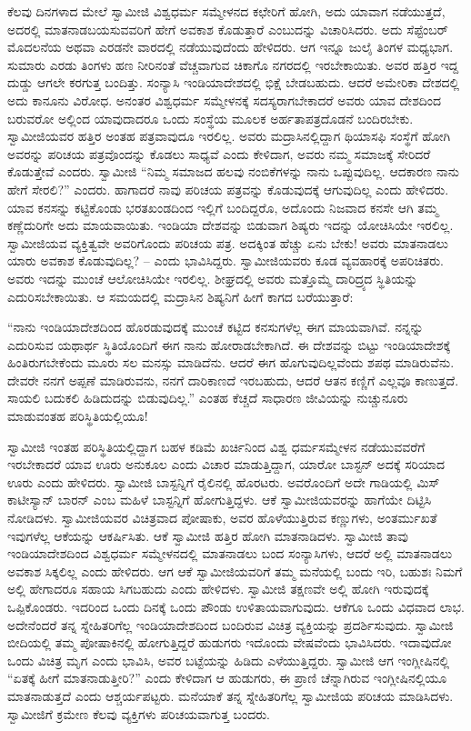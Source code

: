  ಕೆಲವು ದಿನಗಳಾದ ಮೇಲೆ ಸ್ವಾಮೀಜಿ ವಿಶ್ವಧರ್ಮ ಸಮ್ಮೇಳನದ ಕಛೇರಿಗೆ ಹೋಗಿ, ಅದು ಯಾವಾಗ ನಡೆಯುತ್ತದೆ, ಅದರಲ್ಲಿ ಮಾತನಾಡಬಯಸುವವರಿಗೆ ಹೇಗೆ ಅವಕಾಶ ಕೊಡುತ್ತಾರೆ ಎಂಬುದನ್ನು ವಿಚಾರಿಸಿದರು. ಅದು ಸೆಪ್ಟೆಂಬರ್ ಮೊದಲನೆಯ ಅಥವಾ ಎರಡನೇ ವಾರದಲ್ಲಿ ನಡೆಯುವುದೆಂದು ಹೇಳಿದರು. ಆಗ ಇನ್ನೂ ಜುಲೈ ತಿಂಗಳ ಮಧ್ಯಭಾಗ. ಸುಮಾರು ಎರಡು ತಿಂಗಳು ಹಣ ನೀರಿನಂತೆ ವೆಚ್ಚವಾಗುವ ಚಿಕಾಗೊ ನಗರದಲ್ಲಿ ಇರಬೇಕಾಯಿತು. ಅವರ ಹತ್ತಿರ ಇದ್ದ ದುಡ್ಡು ಆಗಲೇ ಕರಗುತ್ತ ಬಂದಿತ್ತು. ಸಂನ್ಯಾಸಿ ಇಂಡಿಯಾದೇಶದಲ್ಲಿ ಭಿಕ್ಷೆ ಬೇಡಬಹುದು. ಆದರೆ ಅಮೇರಿಕಾ ದೇಶದಲ್ಲಿ ಅದು ಕಾನೂನು ವಿರೋಧ. ಅನಂತರ ವಿಶ್ವಧರ್ಮ ಸಮ್ಮೇಳನಕ್ಕೆ ಸದಸ್ಯರಾಗಬೇಕಾದರೆ ಅವರು ಯಾವ ದೇಶದಿಂದ ಬರುವರೋ ಅಲ್ಲಿಂದ ಯಾವುದಾದರೂ ಒಂದು ಸಂಸ್ಥೆಯ ಮೂಲಕ ಅರ್ಹತಾಪತ್ರದೊಡನೆ ಬಂದಿರಬೇಕು. ಸ್ವಾಮೀಜಿಯವರ ಹತ್ತಿರ ಅಂತಹ ಪತ್ರವಾವುದೂ ಇರಲಿಲ್ಲ. ಅವರು ಮದ್ರಾಸಿನಲ್ಲಿದ್ದಾಗ ಥಿಯಾಸಫಿ ಸಂಸ್ಥೆಗೆ ಹೋಗಿ ಅವರನ್ನು ಪರಿಚಯ ಪತ್ರವೊಂದನ್ನು ಕೊಡಲು ಸಾಧ್ಯವೆ ಎಂದು ಕೇಳಿದಾಗ, ಅವರು ನಮ್ಮ ಸಮಾಜಕ್ಕೆ ಸೇರಿದರೆ ಕೊಡುತ್ತೇವೆ ಎಂದರು. ಸ್ವಾಮೀಜಿ “ನಿಮ್ಮ ಸಮಾಜದ ಹಲವು ನಂಬಿಕೆಗಳನ್ನು ನಾನು ಒಪ್ಪುವುದಿಲ್ಲ. ಆದಕಾರಣ ನಾನು ಹೇಗೆ ಸೇರಲಿ?” ಎಂದರು. ಹಾಗಾದರೆ ನಾವು ಪರಿಚಯ ಪತ್ರವನ್ನು ಕೊಡುವುದಕ್ಕೆ ಆಗುವುದಿಲ್ಲ ಎಂದು ಹೇಳಿದರು. ಯಾವ ಕನಸನ್ನು ಕಟ್ಟಿಕೊಂಡು ಭರತಖಂಡದಿಂದ ಇಲ್ಲಿಗೆ ಬಂದಿದ್ದರೊ, ಅದೊಂದು ನಿಜವಾದ ಕನಸೇ ಆಗಿ ತಮ್ಮ ಕಣ್ಣೆದುರಿಗೇ ಅದು ಮಾಯವಾಯಿತು. ಇಂಡಿಯಾ ದೇಶವನ್ನು ಬಿಡುವಾಗ ಶಿಷ್ಯರು ಇದನ್ನು ಯೋಚಿಸಿಯೇ ಇರಲಿಲ್ಲ. ಸ್ವಾಮೀಜಿಯವ ವ್ಯಕ್ತಿತ್ವವೇ ಅವರಿಗೊಂದು ಪರಿಚಯ ಪತ್ರ. ಅದಕ್ಕಿಂತ ಹೆಚ್ಚು ಏನು ಬೇಕು! ಅವರು ಮಾತನಾಡಲು ಯಾರು ಅವಕಾಶ ಕೊಡುವುದಿಲ್ಲ? – ಎಂದು ಭಾವಿಸಿದ್ದರು. ಸ್ವಾಮೀಜಿಯವರು ಕೂಡ ವ್ಯವಹಾರಕ್ಕೆ ಅಪರಿಚಿತರು. ಅವರು ಇದನ್ನು ಮುಂಚೆ ಆಲೋಚಿಸಿಯೇ ಇರಲಿಲ್ಲ. ಶೀಘ್ರದಲ್ಲಿ ಅವರು ಮತ್ತೊಮ್ಮೆ ದಾರಿದ್ರ್ಯದ ಸ್ಥಿತಿಯನ್ನು ಎದುರಿಸಬೇಕಾಯಿತು. ಆ ಸಮಯದಲ್ಲಿ ಮದ್ರಾಸಿನ ಶಿಷ್ಯನಿಗೆ ಹೀಗೆ ಕಾಗದ ಬರೆಯುತ್ತಾರೆ: 

 “ನಾನು ಇಂಡಿಯಾದೇಶದಿಂದ ಹೊರಡುವುದಕ್ಕೆ ಮುಂಚೆ ಕಟ್ಟಿದ ಕನಸುಗಳೆಲ್ಲ ಈಗ ಮಾಯವಾಗಿವೆ. ನನ್ನನ್ನು ಎದುರಿಸುವ ಯಥಾರ್ಥ ಸ್ಥಿತಿಯೊಂದಿಗೆ ಈಗ ನಾನು ಹೋರಾಡಬೇಕಾಗಿದೆ. ಈ ದೇಶವನ್ನು ಬಿಟ್ಟು ಇಂಡಿಯಾದೇಶಕ್ಕೆ ಹಿಂತಿರುಗಬೇಕೆಂದು ಮೂರು ಸಲ ಮನಸ್ಸು ಮಾಡಿದೆನು. ಆದರೆ ಈಗ ಹೊಗುವುದಿಲ್ಲವೆಂದು ಶಪಥ ಮಾಡಿರುವೆನು. ದೇವರೇ ನನಗೆ ಅಪ್ಪಣೆ ಮಾಡಿರುವನು, ನನಗೆ ದಾರಿಕಾಣದೆ ಇರಬಹುದು, ಆದರೆ ಆತನ ಕಣ್ಣಿಗೆ ಎಲ್ಲವೂ ಕಾಣುತ್ತದೆ. ಸಾಯಲಿ ಬದುಕಲಿ ಹಿಡಿದುದನ್ನು ಬಿಡುವುದಿಲ್ಲ.” ಎಂತಹ ಕೆಚ್ಚದೆ ಸಾಧಾರಣ ಜೀವಿಯನ್ನು ನುಚ್ಚುನೂರು ಮಾಡುವಂತಹ ಪರಿಸ್ಥಿತಿಯಲ್ಲಿಯೂ! 

 ಸ್ವಾಮೀಜಿ ಇಂತಹ ಪರಿಸ್ಥಿತಿಯಲ್ಲಿದ್ದಾಗ ಬಹಳ ಕಡಿಮೆ ಖರ್ಚಿನಿಂದ ವಿಶ್ವ ಧರ್ಮಸಮ್ಮೇಳನ ನಡೆಯುವವರೆಗೆ ಇರಬೇಕಾದರೆ ಯಾವ ಊರು ಅನುಕೂಲ ಎಂದು ವಿಚಾರ ಮಾಡುತ್ತಿದ್ದಾಗ, ಯಾರೋ ಬಾಸ್ಟನ್ ಅದಕ್ಕೆ ಸರಿಯಾದ ಊರು ಎಂದು ಹೇಳಿದರು. ಸ್ವಾಮೀಜಿ ಬಾಸ್ಟನ್ನಿಗೆ ರೈಲಿನಲ್ಲಿ ಹೊರಟರು. ಅವರೊಂದಿಗೆ ಅದೇ ಗಾಡಿಯಲ್ಲಿ ಮಿಸ್ ಕಾಟೀಸ್ಯಾನ್ ಬಾರನ್ ಎಂಬ ಮಹಿಳೆ ಬಾಸ್ಟನ್ನಿಗೆ ಹೋಗುತ್ತಿದ್ದಳು. ಆಕೆ ಸ್ವಾಮೀಜಿಯವರನ್ನು ಹಾಗೆಯೇ ದಿಟ್ಟಿಸಿ ನೋಡಿದಳು. ಸ್ವಾಮೀಜಿಯವರ ವಿಚಿತ್ರವಾದ ಪೋಷಾಕು, ಅವರ ಹೊಳೆಯುತ್ತಿರುವ ಕಣ್ಣುಗಳು, ಅಂತರ್ಮುಖತೆ ಇವುಗಳೆಲ್ಲ ಆಕೆಯನ್ನು ಆಕರ್ಷಿಸಿತು. ಆಕೆ ಸ್ವಾಮೀಜಿ ಹತ್ತಿರ ಹೋಗಿ ಮಾತನಾಡಿದಳು. ಸ್ವಾಮೀಜಿ ತಾವು ಇಂಡಿಯಾದೇಶದಿಂದ ವಿಶ್ವಧರ್ಮ ಸಮ್ಮೇಳನದಲ್ಲಿ ಮಾತನಾಡಲು ಬಂದ ಸಂನ್ಯಾಸಿಗಳು, ಆದರೆ ಅಲ್ಲಿ ಮಾತನಾಡಲು ಅವಕಾಶ ಸಿಕ್ಕಲಿಲ್ಲ ಎಂದು ಹೇಳಿದರು. ಆಗ ಆಕೆ ಸ್ವಾಮೀಜಿಯವರಿಗೆ ತಮ್ಮ ಮನೆಯಲ್ಲಿ ಬಂದು ಇರಿ, ಬಹುಶಃ ನಿಮಗೆ ಅಲ್ಲಿ ಹೇಗಾದರೂ ಸಹಾಯ ಸಿಗಬಹುದು ಎಂದು ಹೇಳಿದಳು. ಸ್ವಾಮೀಜಿ ತಕ್ಷಣವೇ ಅಲ್ಲಿ ಹೋಗಿ ಇರುವುದಕ್ಕೆ ಒಪ್ಪಿಕೊಂಡರು. ಇದರಿಂದ ಒಂದು ದಿನಕ್ಕೆ ಒಂದು ಪೌಂಡು ಉಳಿತಾಯವಾಗುವುದು. ಆಕೆಗೂ ಒಂದು ವಿಧವಾದ ಲಾಭ. ಅದೇನೆಂದರೆ ತನ್ನ ಸ್ನೇಹಿತರಿಗೆಲ್ಲ ಇಂಡಿಯಾದೇಶದಿಂದ ಬಂದಿರುವ ವಿಚಿತ್ರ ವ್ಯಕ್ತಿಯನ್ನು ಪ್ರದರ್ಶಿಸುವುದು. ಸ್ವಾಮೀಜಿ ಬೀದಿಯಲ್ಲಿ ತಮ್ಮ ಪೋಷಾಕಿನಲ್ಲಿ ಹೋಗುತ್ತಿದ್ದರೆ ಹುಡುಗರು ಇದೊಂದು ವೇಷವೆಂದು ಭಾವಿಸಿದರು. ಇದಾವುದೋ ಒಂದು ವಿಚಿತ್ರ ಮೃಗ ಎಂದು ಭಾವಿಸಿ, ಅವರ ಬಟ್ಟೆಯನ್ನು ಹಿಡಿದು ಎಳೆಯುತ್ತಿದ್ದರು. ಸ್ವಾಮೀಜಿ ಆಗ ಇಂಗ್ಲೀಷಿನಲ್ಲಿ “ಏತಕ್ಕೆ ಹೀಗೆ ಮಾತನಾಡುತ್ತೀರಿ?” ಎಂದು ಕೇಳಿದಾಗ ಆ ಹುಡುಗರು, ಈ ಪ್ರಾಣಿ ಚೆನ್ನಾಗಿರುವ ಇಂಗ್ಲೀಷಿನಲ್ಲಿಯೂ ಮಾತನಾಡುತ್ತದೆ ಎಂದು ಆಶ್ಚರ್ಯಪಟ್ಟರು. ಮನೆಯಾಕೆ ತನ್ನ ಸ್ನೇಹಿತರಿಗೆಲ್ಲ ಸ್ವಾಮೀಜಿಯ ಪರಿಚಯ ಮಾಡಿಸಿದಳು. ಸ್ವಾಮೀಜಿಗೆ ಕ್ರಮೇಣ ಕೆಲವು ವ್ಯಕ್ತಿಗಳು ಪರಿಚಯವಾಗುತ್ತ ಬಂದರು. 

